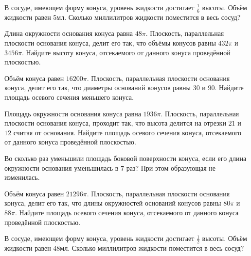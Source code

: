\documentclass[a4paper]{article}
\begin{document}
\begin{taskBN}{85}
В сосуде, имеющем форму конуса, уровень жидкости достигает $\frac{1}{6}$ высоты. Объём жидкости равен 5мл. Сколько миллилитров жидкости поместится в весь сосуд?
\end{taskBN}

\begin{taskBN}{86}
Длина окружности основания конуса равна $48\pi$. Плоскость, параллельная плоскости основания конуса,  делит его так, что объёмы конусов равны $432\pi$ и $3456\pi$. Найдите высоту конуса, отсекаемого от данного конуса проведённой плоскостью. 
\end{taskBN}

\begin{taskBN}{87}
Объём конуса равен $16200\pi$. Плоскость, параллельная плоскости основания конуса,  делит его так, что диаметры оснований конусов равны $30$ и $90$. Найдите площадь осевого сечения меньшего конуса. 
\end{taskBN}

\begin{taskBN}{88}
Площадь окружности основания конуса равна $1936\pi$. Плоскость, параллельная плоскости основания конуса,  проходит так, что высота делится на отрезки $21$ и $12$ считая от основания. Найдите площадь осевого сечения конуса, отсекаемого от данного конуса проведённой плоскостью. 
\end{taskBN}

\begin{taskBN}{89}
Во сколько раз уменьшили площадь боковой поверхности конуса, если его длина окружности основания уменьшилась в 7 раз? При этом образующая не изменилась.
\end{taskBN}

\begin{taskBN}{90}
Объём конуса равен $21296\pi$. Плоскость, параллельная плоскости основания конуса,  делит его так, что длины окружностей оснований конусов равны $80\pi$ и $88\pi$. Найдите площадь осевого сечения конуса, отсекаемого от данного конуса проведённой плоскостью. 
\end{taskBN}

\begin{taskBN}{91}
В сосуде, имеющем форму конуса, уровень жидкости достигает $\frac{1}{2}$ высоты. Объём жидкости равен 48мл. Сколько миллилитров жидкости поместится в весь сосуд?
\end{taskBN}
\end{document}
